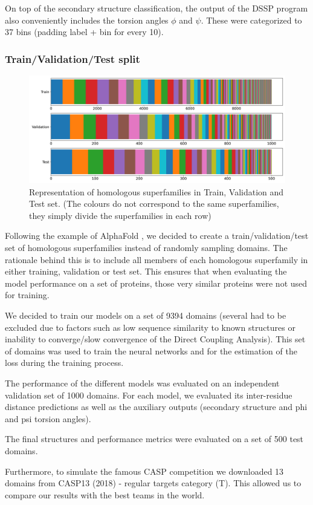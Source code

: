 On top of the secondary structure classification, the output of the DSSP program also conveniently includes the torsion angles $\phi$ and $\psi$. These were categorized to 37 bins (padding label + bin for every 10\degree).

\subsubsection{Train/Validation/Test split}

\begin{figure}
    \centering
    \includegraphics[width=\linewidth]{imgs_tomas/cath_distributions_trainvaltest.png}
    \caption{Representation of homologous superfamilies in Train, Validation and Test set. (The colours do not correspond to the same superfamilies, they simply divide the superfamilies in each row)}
    \label{fig:cath_trainvaltest}
\end{figure}

Following the example of AlphaFold \cite{alphafold}, we decided to create a train/validation/test set of homologous superfamilies instead of randomly sampling domains. 
The rationale behind this is to include all members of each homologous superfamily in either training, validation or test set. 
This ensures that when evaluating the model performance on a set of proteins, those very similar proteins were not used for training. 
    
We decided to train our models on a set of 9394 domains (several had to be excluded due to factors such as low sequence similarity to known structures or inability to converge/slow convergence of the Direct Coupling Analysis). This set of domains was used to train the neural networks and for the estimation of the loss during the training process.

The performance of the different models was evaluated on an independent validation set of 1000 domains. For each model, we evaluated its inter-residue distance predictions as well as the auxiliary outputs (secondary structure and phi and psi torsion angles).

The final structures and performance metrics were evaluated on a set of 500 test domains.
    
Furthermore, to simulate the famous CASP competition we downloaded 13 domains from CASP13 (2018) - regular targets category (T). This allowed us to compare our results with the best teams in the world.